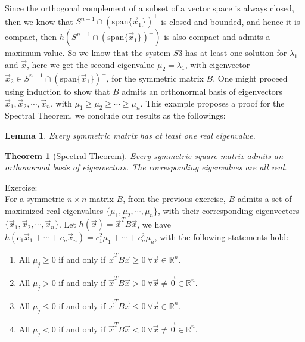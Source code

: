 \documentclass[15pt]{book}
\theoremstyle{break}
\theoremstyle{break}
\newtheorem{thm}{Theorem}[section]
\newtheorem{lem}{Lemma}[thm]
\newcommand{\R}{\mathbb{R}}
\newcommand{\spa}{\text{span}}
\newcommand{\exercise}{\color{green}Exercise: \color{black}}
\begin{document}
Since the orthogonal complement of a subset of a vector space is always closed, then we know that $ S^{n-1}\cap (\spa\{ \vec{x}_1\})^\perp$ is closed and bounded, and hence it is compact, then $h( S^{n-1}\cap (\spa\{ \vec{x}_1\})^\perp)$ is also compact and admits a maximum value. So we know that the system $S3$ has at least one solution for $\lambda_1$ and $\vec{x}$, here we get the second eigenvalue $\mu_2 = \lambda_1$, with eigenvector $\vec{x}_2 \in S^{n-1}\cap (\spa\{ \vec{x}_1\})^\perp$, for the symmetric matrix $B$. One might proceed using induction to show that $B$ admits an orthonormal basis of eigenvectors $\vec{x}_1,\vec{x}_2,\cdots,\vec{x}_n$, with $\mu_1 \geq \mu_2 \geq \cdots \geq \mu_n$. This example proposes a proof for the Spectral Theorem, we conclude our results as the followings:

\begin{lem}
Every symmetric matrix has at least one real eigenvalue. 
\end{lem}

\begin{thm}[Spectral Theorem]
Every symmetric square matrix admits an orthonormal basis of eigenvectors. The corresponding eigenvalues are all real.
\end{thm}

\exercise\\
For a symmetric $n\times n$ matrix $B$, from the previous exercise, $B$ admits a set of maximized real eigenvalues $\{\mu_1,\mu_2,\cdots,\mu_n\}$, with their corresponding eigenvectors $\{\vec{x}_1,\vec{x}_2,\cdots,\vec{x}_n\}$. Let $h(\vec{x}) = \vec{x}^TB\vec{x}$, we have $h(c_1\vec{x}_1 + \cdots + c_n\vec{x}_n) = c_1^2\mu_1 + \cdots + c_n^2 \mu_n$, with the following statements hold:
\begin{enumerate}[topsep=3pt,itemsep=-1ex,partopsep=1ex,parsep=1ex]
\item All $\mu_j \geq 0$ if and only if $\vec{x}^T B \vec{x} \geq 0\ \forall\vec{x} \in \R^n$.
\item All $\mu_j >0$ if and only if $\vec{x}^T B \vec{x} > 0\ \forall\vec{x}\neq \vec{0}\in \R^n$.
\item All $\mu_j \leq 0$ if and only if $\vec{x}^T B \vec{x} \leq 0\ \forall\vec{x} \in \R^n$.
\item All $\mu_j <0$ if and only if $\vec{x}^T B \vec{x} < 0\ \forall\vec{x}\neq \vec{0}\in \R^n$.
\end{enumerate}
\end{document}
